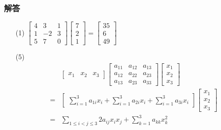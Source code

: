 \documentclass{beamer}
\begin{document}
\begin{frame}
\frametitle{解答}
    \begin{enumerate}
        \item[(1)] \(\begin{bmatrix}
                4 & 3 & 1 \\1&-2&3\\5&7&0
            \end{bmatrix}\begin{bmatrix}
                7 \\2\\1
            \end{bmatrix}=\begin{bmatrix}
                35 \\6\\49
            \end{bmatrix}\)
            \pause
        \item[(5)]
            \begin{align*}
                  & \begin{bmatrix}
                    x_1 & x_2 & x_3
                \end{bmatrix}
                \begin{bmatrix}
                    a_{11} & a_{12} & a_{13} \\
                    a_{12} & a_{22} & a_{23} \\
                    a_{13} & a_{23} & a_{33}
                \end{bmatrix}
                \begin{bmatrix}
                    x_1 \\x_2\\x_3
                \end{bmatrix}                                                 \\
                = & \begin{bmatrix}\sum_{i=1}^3a_{1i}x_i+\sum_{i=1}^3a_{2i}x_i+\sum_{i=1}^3a_{3i}x_i\end{bmatrix}
                \begin{bmatrix}x_1 \\x_2 \\x_3\end{bmatrix}                                                 \\
                = & \sum_{1 \leq i<j \leq 3} 2 a_{i j} x_i x_j+\sum_{k=1}^3 a_{k k} x_k^2
            \end{align*}

    \end{enumerate}
\end{frame}
\end{document}

